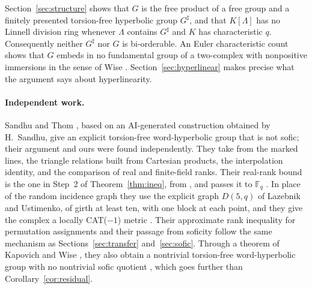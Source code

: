 \documentclass[11pt]{article}
\theoremstyle{definition}
\theoremstyle{remark}
\numberwithin{equation}{section}
\newcommand{\F}{\mathbb F}
\begin{document}
Section~\ref{sec:structure} shows that $G$ is the free product of a free group and a finitely presented torsion-free hyperbolic group $G^\sharp$, and that $K[\Lambda]$ has no Linnell division ring whenever $\Lambda$ contains $G^\sharp$ and $K$ has characteristic $q$. Consequently neither $G^\sharp$ nor $G$ is bi-orderable. An Euler characteristic count shows that $G$ embeds in no fundamental group of a two-complex with nonpositive immersions in the sense of Wise \cite{Wise2003}. Section~\ref{sec:hyperlinear} makes precise what the argument says about hyperlinearity.

\paragraph{Independent work.} Sandhu and Thom \cite{SandhuThom26}, based on an AI-generated construction obtained by H.~Sandhu, give an explicit torsion-free word-hyperbolic group that is not sofic; their argument and ours were found independently. They take from \cite{OAI252} the marked lines, the triangle relations built from Cartesian products, the interpolation identity, and the comparison of real and finite-field ranks. Their real-rank bound is the one in Step~2 of Theorem~\ref{thm:ineq}, from \cite[Theorem~6]{AHKPY2011}, and \cite[Lemma~2.4]{OAI252} passes it to $\F_q$ \cite[Lemmas~3.2 and~3.3]{SandhuThom26}. In place of the random incidence graph they use the explicit graph $D(5,q)$ of Lazebnik and Ustimenko, of girth at least ten, with one block at each point, and they give the complex a locally CAT($-1$) metric \cite[Theorem~A]{SandhuThom26}. Their approximate rank inequality for permutation assignments \cite[Theorem~3.1]{SandhuThom26} and their passage from soficity \cite[Section~5]{SandhuThom26} follow the same mechanism as Sections~\ref{sec:transfer} and~\ref{sec:sofic}. Through a theorem of Kapovich and Wise \cite{KapovichWise2000}, they also obtain a nontrivial torsion-free word-hyperbolic group with no nontrivial sofic quotient \cite[Corollary~B]{SandhuThom26}, which goes further than Corollary~\ref{cor:residual}.
\end{document}
